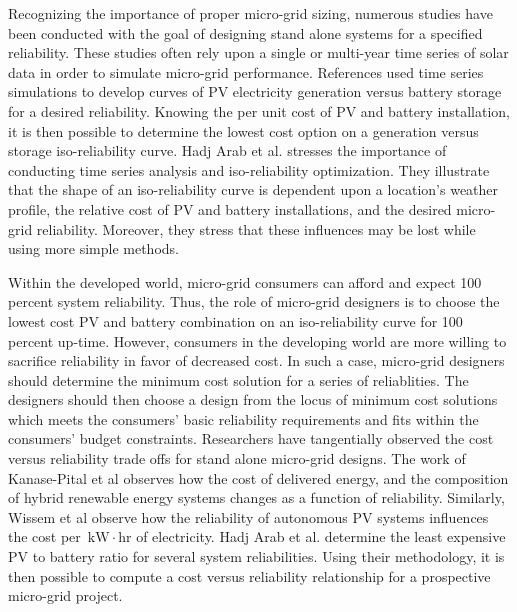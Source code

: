 \documentclass{article}
\newcommand{\unit}[1]{\ensuremath{\, \mathrm{#1}}}
\begin{document}
Recognizing the importance of proper micro-grid sizing, numerous studies have been conducted with the goal of designing stand alone systems for a specified reliability. 
These studies often rely upon a single or multi-year time series of solar data in order to simulate micro-grid performance. 
References \cite{Markvart,Arun,Hadj} used time series simulations to develop curves of PV electricity generation versus battery storage for a desired reliability. 
Knowing the per unit cost of PV and battery installation, it is then possible to determine the lowest cost option on a generation versus storage iso-reliability curve. 
Hadj Arab et al. stresses the importance of conducting time series analysis and iso-reliability optimization. 
They illustrate that the shape of an iso-reliability curve is dependent upon a location's weather profile, the relative cost of PV and battery installations, and the desired micro-grid reliability. 
Moreover, they stress that these influences may be lost while using more simple methods. \cite{Hadj}   

Within the developed world, micro-grid consumers can afford and expect 100 percent system reliability.
Thus, the role of micro-grid designers is to choose the lowest cost PV and battery combination on an iso-reliability curve for 100 percent up-time.
However, consumers in the developing world are more willing to sacrifice reliability in favor of decreased cost.
In such a case, micro-grid designers should determine the minimum cost solution for a series of reliablities. 
The designers should then choose a design from the locus of minimum cost solutions which meets the consumers' basic reliability requirements and fits within the consumers' budget constraints. 
Researchers \cite{Hadj,Kanase,Wissem} have tangentially observed the cost versus reliability trade offs for stand alone micro-grid designs.  
The work of Kanase-Pital et al \cite{Kanase} observes how the cost of delivered energy, and the composition of hybrid renewable energy systems changes as a function of reliability.  
Similarly, Wissem et al \cite{Wissem} observe how the reliability of autonomous PV systems influences the cost per \unit{kW \! \cdot \! hr} of electricity. 
Hadj Arab et al. \cite{Hadj} determine the least expensive PV to battery ratio for several system reliabilities. 
Using their methodology, it is then possible to compute a cost versus reliability relationship for a prospective micro-grid project. 
\end{document}
